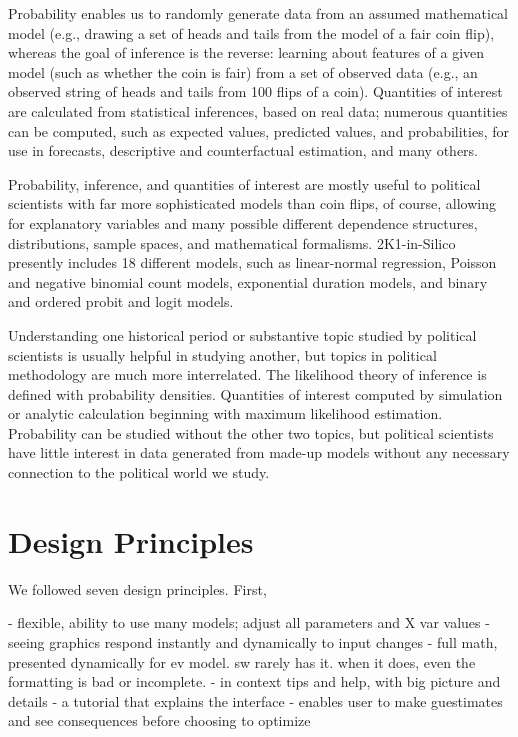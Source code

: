 \documentclass[12pt]{article}
\theoremstyle{definition}
\begin{document}
Probability enables us to randomly generate data from an assumed mathematical model (e.g., drawing a set of heads and tails from the model of a fair coin flip), whereas the goal of inference is the reverse: learning about features of a given model (such as whether the coin is fair) from a set of observed data (e.g., an observed string of heads and tails from 100 flips of a coin). Quantities of interest are calculated from statistical inferences, based on real data; numerous quantities can be computed, such as expected values, predicted values, and probabilities, for use in forecasts, descriptive and counterfactual estimation, and many others.

Probability, inference, and quantities of interest are mostly useful to political scientists with far more sophisticated models than coin flips, of course, allowing for explanatory variables and many possible different dependence structures, distributions, sample spaces, and mathematical formalisms.  2K1-in-Silico presently includes 18 different models, such as linear-normal regression, Poisson and negative binomial count models, exponential duration models, and binary and ordered probit and logit models.

Understanding one historical period or substantive topic studied by political scientists is usually helpful in studying another, but topics in political methodology are much more interrelated.  The likelihood theory of inference is defined with probability densities. Quantities of interest computed by simulation or analytic calculation beginning with maximum likelihood estimation. Probability can be studied without the other two topics, but political scientists have little interest in data generated from made-up models without any necessary connection to the political world we study.

\section{Design Principles}

We followed seven design principles.  First, 

- flexible, ability to use many models; adjust all parameters and X var values
- seeing graphics respond instantly and dynamically to input changes
- full math, presented dynamically for ev model.  sw rarely has it. when it does, even the formatting is bad or incomplete.
- in context tips and help, with big picture and details
- a tutorial that explains the interface
- enables user to make guestimates and see consequences before choosing to optimize
\end{document}
